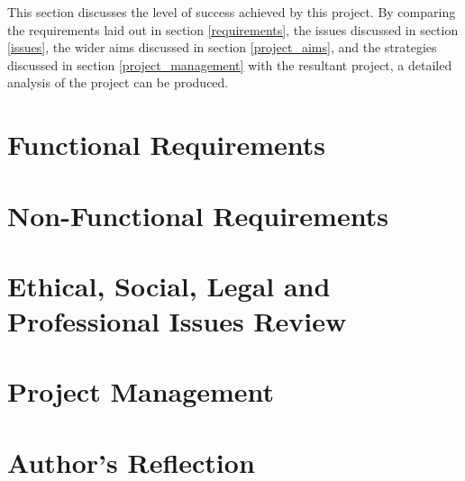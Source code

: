 This section discusses the level of success achieved by this project. By comparing the requirements laid out in section \ref{requirements}, the issues discussed in section \ref{issues}, the wider aims discussed in section \ref{project_aims}, and the strategies discussed in section \ref{project_management} with the resultant project, a detailed analysis of the project can be produced.

\section{Functional Requirements}
\label{evaluation_functional_requirements}


\section{Non-Functional Requirements}
\label{evaluation_non_functional_requirements}


\section{Ethical, Social, Legal and Professional Issues Review}
\label{ethical_social_legal_and_professional_issues_review}


\section{Project Management}
\label{evaluation_project_management}


\section{Author's Reflection}
\label{authors_reflection}

